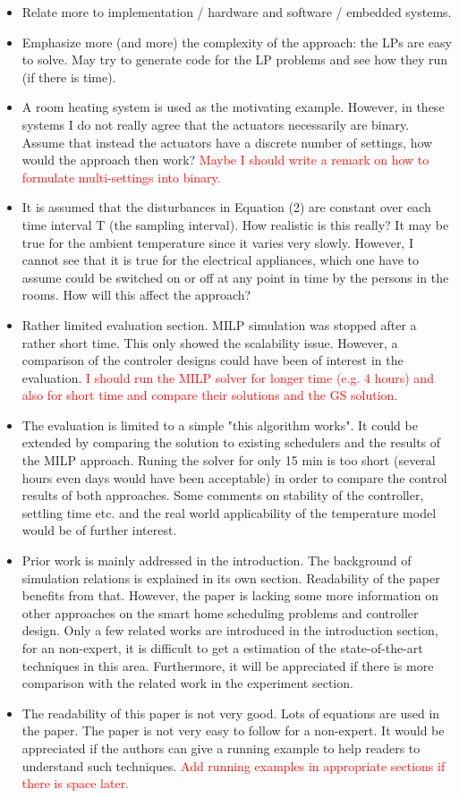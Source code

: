 \documentclass{sig-alternate}
\begin{document}
\begin{itemize}
\item Relate more to implementation / hardware and software / embedded systems.
\item Emphasize more (and more) the complexity of the approach: the LPs are easy to solve. May try to generate code for the LP problems and see how they run (if there is time).
\item A room heating system is used as the motivating example. However, in these
systems I do not really agree that the actuators necessarily are binary. Assume
that instead the actuators have a discrete number of settings, how would the
approach then work? \textcolor{red}{Maybe I should write a remark on how to formulate multi-settings into binary.}
\item It is assumed that the disturbances in Equation (2) are constant over each time
interval T (the sampling interval). How realistic is this really? It may be
true for the ambient temperature since it varies very slowly. However, I cannot
see that it is true for the electrical appliances, which one have to assume
could be switched on or off at any point in time by the persons in the rooms.
How will this affect the approach?
\item Rather limited evaluation section. MILP simulation was stopped after a 
rather short time. This only showed the scalability issue. However, a 
comparison of the controler designs could have been of interest in the 
evaluation. \textcolor{red}{I should run the MILP solver for longer time (e.g. 4 hours) and also for short time and compare their solutions and the GS solution.}
\item The evaluation is limited to a simple "this algorithm works". It could be 
extended by comparing the solution to existing schedulers and the results 
of the MILP approach. Runing the solver for only 15 min is too short (several 
hours even days would have been acceptable) in order to compare the control 
results of both approaches. Some comments on stability of the controller, 
settling time etc. and the real world applicability of the temperature model 
would be of further interest.
\item Prior work is mainly addressed in the introduction. The background of
simulation 
relations is explained in its own section. Readability of the paper benefits
from 
that. However, the paper is lacking some more information on other approaches
on 
the smart home scheduling problems and controller design.
Only a few related works are introduced in the introduction section, for an
non-expert, it is difficult to get a estimation of the state-of-the-art
techniques in this area. Furthermore, it will be appreciated if there is more
comparison with the related work in the experiment section.
\item The readability of this paper is not very good. Lots of equations are used
in the paper. The paper is not very easy to follow for a non-expert. It would
be appreciated if the authors can give a running example to help readers to
understand such techniques. \textcolor{red}{Add running examples in appropriate sections if there is space later.}
\end{itemize}
\end{document}
